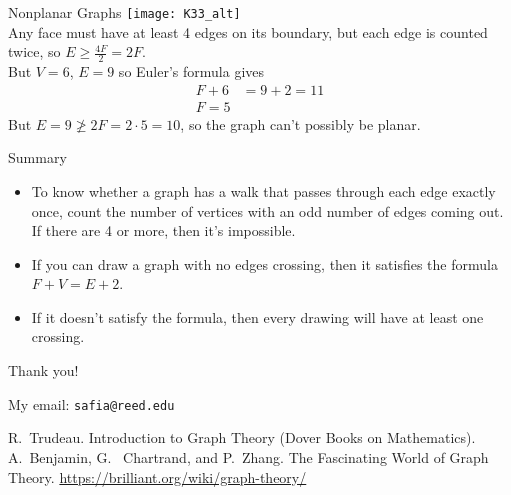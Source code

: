 \documentclass{beamer}
\begin{document}
\begin{frame}{Nonplanar Graphs}
\texttt{[image: K33\_alt]}\vspace*{.2cm}\\
Any face must have at least 4 edges on its boundary, but each edge is counted twice, so $E\geq\frac{4F}{2}=2F$.\\
 But $V=6$, $E=9$ so Euler's formula gives 
 \begin{align*}
 F+6 &= 9 + 2 = 11\\
 F=5
 \end{align*}
 But $E = 9 \not\geq2F= 2 \cdot 5 = 10$, so the graph can't possibly be planar.
\end{frame}
\begin{frame}{Summary}
\begin{itemize}
\item To know whether a graph has a walk that passes through each edge exactly once, count the number of vertices with an odd number of edges coming out. If there are 4 or more, then it's impossible.
\item If you can draw a graph with no edges crossing, then it satisfies the formula $F+V=E+2$.
\item If it doesn't satisfy the formula, then every drawing will have at least one crossing.
\end{itemize}
\end{frame}
\begin{frame}
\huge{Thank you!}\vspace*{.2cm}
    \normalsize
    
  My email:
  \texttt{safia@reed.edu}
  \begin{thebibliography}{10}

  \beamertemplatearticlebibitems
    R.~Trudeau.
\newblock Introduction to Graph Theory (Dover Books on Mathematics).
 A.~Benjamin, G.~ Chartrand, and P.~Zhang.
 \newblock The Fascinating World of Graph Theory.
  \url{https://brilliant.org/wiki/graph-theory/}
   \end{thebibliography}
  
\end{frame}
\end{document}

